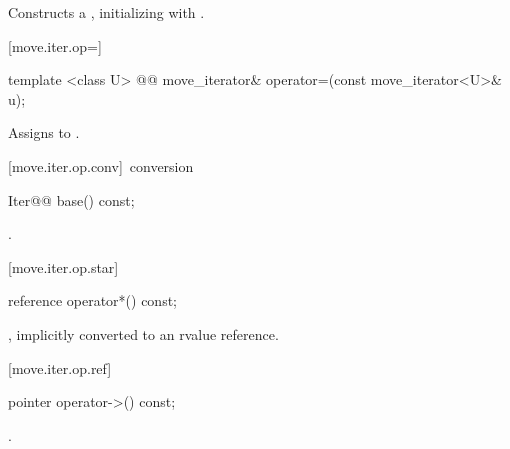 \documentclass[american,twoside]{book}
\begin{document}
\begin{paras}
\begin{itemdescr}
\pnum
\effects Constructs a , initializing
 with .

\pnum
{}
\end{itemdescr}

[move.iter.op=]{}

\begin{itemdecl}
template <class U> 
  @@ 
  move_iterator& operator=(const move_iterator<U>& u);
\end{itemdecl}

\begin{itemdescr}
\pnum
\effects Assigns  to
.

\pnum
{}
\end{itemdescr}

[move.iter.op.conv]{\ conversion}

\begin{itemdecl}
Iter@@ base() const;
\end{itemdecl}

\begin{itemdescr}
\pnum
\returns {}.
\end{itemdescr}

[move.iter.op.star]{}

\begin{itemdecl}
reference operator*() const;
\end{itemdecl}

\begin{itemdescr}
\pnum
\returns {}, implicitly converted
to an rvalue reference.
\end{itemdescr}

[move.iter.op.ref]{}

\begin{itemdecl}
pointer operator->() const;
\end{itemdecl}

\begin{itemdescr}
\pnum
\returns {}.
\end{itemdescr}


\end{paras}
\end{document}
